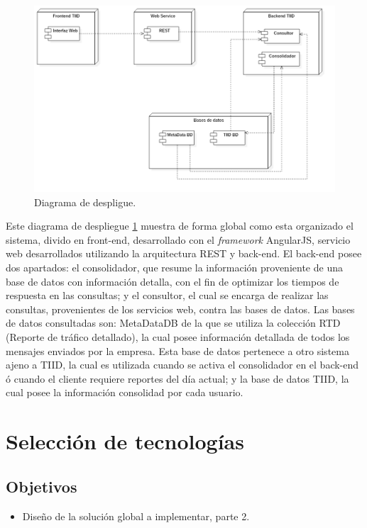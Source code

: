 \pagebreak
\begin{figure}[ht]
  \centering
  \includegraphics[scale=0.50,type=png,ext=.png,read=.png]{imagenes/ddd}
  \caption{Diagrama de despligue.}
  \label{fig:ddd}
\end{figure}

\indent Este diagrama de despliegue \ref{fig:ddd} muestra de forma global como esta organizado el sistema, divido en front-end, desarrollado con el \textit{framework} AngularJS, servicio web desarrollados utilizando la arquitectura REST y back-end. El back-end posee dos apartados: el consolidador, que resume la información proveniente de una base de datos con información detalla, con el fin de optimizar los tiempos de respuesta en las consultas; y el consultor, el cual se encarga de realizar las consultas, provenientes de los servicios web, contra las bases de datos. Las bases de datos consultadas son: MetaDataDB de la que se utiliza la colección RTD (Reporte de tráfico detallado), la cual posee información detallada de todos los mensajes enviados por la empresa. Esta base de datos pertenece a otro sistema ajeno a TIID, la cual es utilizada cuando se activa el consolidador en el back-end ó cuando el cliente requiere reportes del día actual; y la base de datos TIID, la cual posee la información consolidad por cada usuario.

\section{Selección de tecnologías} \label{sect:Seleccion de tecnologias}

\subsection{Objetivos}
\begin{itemize}[noitemsep,nolistsep]
\item Diseño de la solución global a implementar, parte 2. 
\end{itemize}

